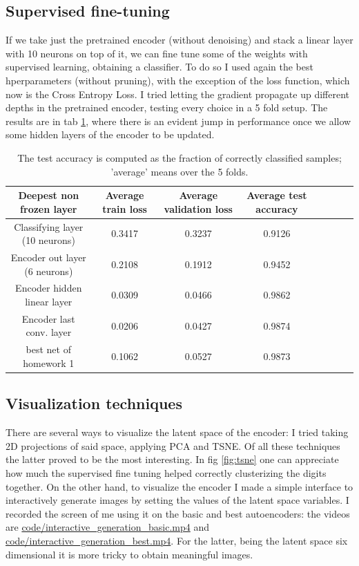 \documentclass[a4paper, 11pt]{article}
\begin{document}
  \vspace{-0.7cm}
  \subsection{Supervised fine-tuning}
    If we take just the pretrained encoder (without denoising) and stack a linear layer with 10 neurons on top of it, we can fine tune some of the weights with supervised learning, obtaining a classifier. To do so I used again the best hperparameters (without pruning), with the exception of the loss function, which now is the Cross Entropy Loss. I tried letting the gradient propagate up different depths in the pretrained encoder, testing every choice in a 5 fold setup. The results are in tab \ref{tab:sup_ft}, where there is an evident jump in performance once we allow some hidden layers of the encoder to be updated.
    \begin{table}[H]
      \centering
      \begin{tabular}{c|ccccccc}
        Deepest non frozen layer & Average train loss & Average validation loss & Average test accuracy \\
        \midrule
        Classifying layer (10 neurons) & 0.3417 & 0.3237 & 0.9126 \\
        Encoder out layer (6 neurons) & 0.2108 & 0.1912 & 0.9452 \\
        Encoder hidden linear layer & 0.0309 & 0.0466 & 0.9862 \\
        Encoder last conv. layer & 0.0206 & 0.0427 & 0.9874 \\
        \midrule
        best net of homework 1 & 0.1062 & 0.0527 & 0.9873 \\
      \end{tabular}
      \caption{The test accuracy is computed as the fraction of correctly classified samples; 'average' means over the 5 folds.}
      \label{tab:sup_ft}
    \end{table}

  \subsection{Visualization techniques}
    There are several ways to visualize the latent space of the encoder: I tried taking 2D projections of said space, applying PCA and TSNE. Of all these techniques the latter proved to be the most interesting. In fig \ref{fig:tsne} one can appreciate how much the supervised fine tuning helped correctly clusterizing the digits together. On the other hand, to visualize the encoder I made a simple interface to interactively generate images by setting the values of the latent space variables. I recorded the screen of me using it on the basic and best autoencoders: the videos are \url{code/interactive_generation_basic.mp4} and \url{code/interactive_generation_best.mp4}. For the latter, being the latent space six dimensional it is more tricky to obtain meaningful images.
\end{document}
